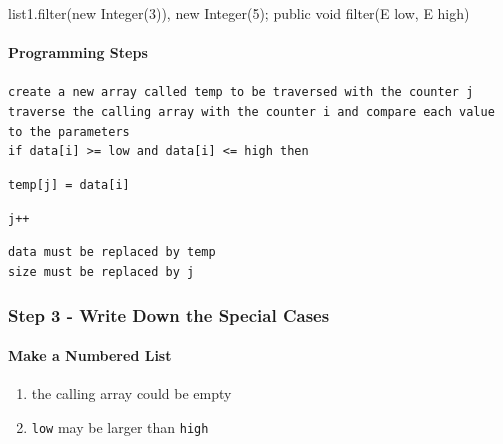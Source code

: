 \noindent
\begin{minipage}{0.25\textwidth}
    \phantom{text}
\end{minipage}
\begin{minipage}{0.5\textwidth}
    \begin{tightcode}
list1.filter(new Integer(3)), new Integer(5);
public void filter(E low, E high)
    \end{tightcode}
\end{minipage}

\newpage

\paragraph{Programming Steps}

\noindent
\texttt{create a new array called temp to be traversed with the counter j}\\
\texttt{traverse the calling array with the counter i and compare each value to the parameters}\\
\texttt{if data[i] >= low and data[i] <= high then}\\

\vspace{-0.5cm}

\texttt{temp[j] = data[i]}\\

\vspace{-0.5cm}

\texttt{j++}\\

\vspace{-0.5cm}

\noindent
\texttt{data must be replaced by temp}\\
\texttt{size must be replaced by j}

\subsubsection{Step 3 - Write Down the Special Cases}

\paragraph*{Make a Numbered List}
\begin{enumerate}
    \item the calling array could be empty 
    \item \texttt{low} may be larger than \texttt{high}
\end{enumerate}

